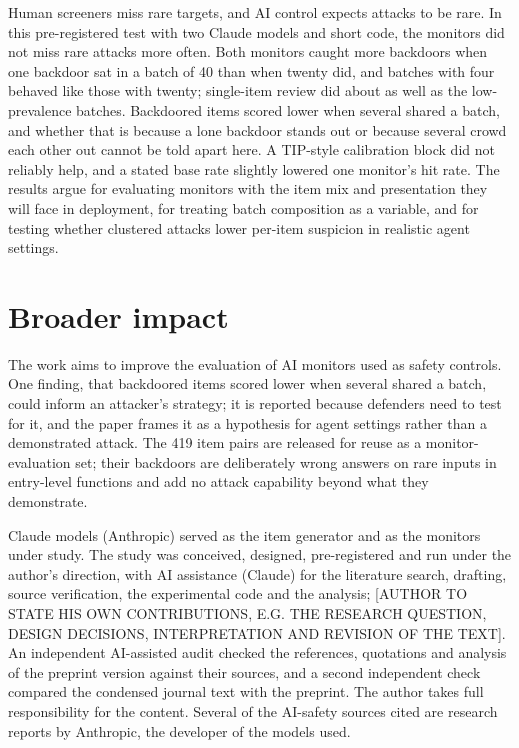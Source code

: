 \documentclass[manuscript, screen, review]{jair}
\begin{document}
Human screeners miss rare targets, and AI control expects attacks to be rare. In this pre-registered test with two Claude models and short code, the monitors did not miss rare attacks more often. Both monitors caught more backdoors when one backdoor sat in a batch of 40 than when twenty did, and batches with four behaved like those with twenty; single-item review did about as well as the low-prevalence batches. Backdoored items scored lower when several shared a batch, and whether that is because a lone backdoor stands out or because several crowd each other out cannot be told apart here. A TIP-style calibration block did not reliably help, and a stated base rate slightly lowered one monitor's hit rate. The results argue for evaluating monitors with the item mix and presentation they will face in deployment, for treating batch composition as a variable, and for testing whether clustered attacks lower per-item suspicion in realistic agent settings.


\section*{Broader impact}

The work aims to improve the evaluation of AI monitors used as safety controls. One finding, that backdoored items scored lower when several shared a batch, could inform an attacker's strategy; it is reported because defenders need to test for it, and the paper frames it as a hypothesis for agent settings rather than a demonstrated attack. The 419 item pairs are released for reuse as a monitor-evaluation set; their backdoors are deliberately wrong answers on rare inputs in entry-level functions and add no attack capability beyond what they demonstrate.


\begin{acks}
Claude models (Anthropic) served as the item generator and as the monitors under study. The study was conceived, designed, pre-registered and run under the author's direction, with AI assistance (Claude) for the literature search, drafting, source verification, the experimental code and the analysis; [AUTHOR TO STATE HIS OWN CONTRIBUTIONS, E.G. THE RESEARCH QUESTION, DESIGN DECISIONS, INTERPRETATION AND REVISION OF THE TEXT]. An independent AI-assisted audit checked the references, quotations and analysis of the preprint version against their sources, and a second independent check compared the condensed journal text with the preprint. The author takes full responsibility for the content. Several of the AI-safety sources cited are research reports by Anthropic, the developer of the models used.
\end{acks}
\end{document}
